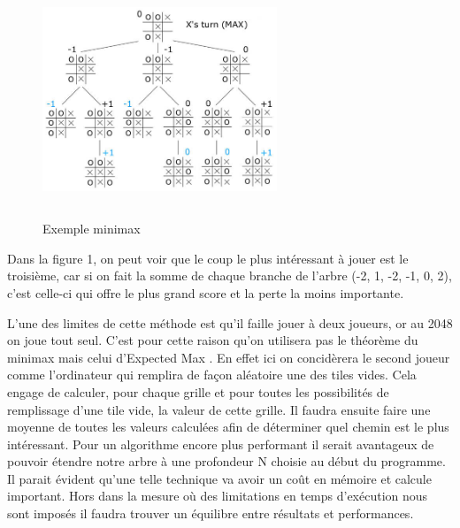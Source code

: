 \documentclass{article}
\begin{document}
\begin{figure}[!h]
   \includegraphics[width=7cm,height=7cm]{minimax.jpg}
   \caption{\label{minimax} Exemple minimax}
\end{figure}

Dans la figure 1, on peut voir que le coup le plus intéressant à jouer est le troisi\`eme, car si on fait la somme de chaque branche de l'arbre (-2, 1, -2, -1, 0, 2), c'est celle-ci qui offre le plus grand score et la perte la moins importante.

L'une des limites de cette m\'ethode est qu'il faille jouer \`a deux joueurs, or au 2048 on joue tout seul. C'est pour cette raison qu'on utilisera pas le th\'eor\`eme du \og minimax \fg{} mais celui d'\og Expected Max \fg{}. En effet ici on concid\`erera le second joueur comme l'ordinateur qui remplira de façon aléatoire une des tiles vides. Cela engage de calculer, pour chaque grille et pour toutes les possibilit\'es de remplissage d'une tile vide, la valeur de cette grille. Il faudra ensuite faire une moyenne de toutes les valeurs calculées afin de déterminer quel chemin est le plus intéressant. Pour un algorithme encore plus performant il serait avantageux de pouvoir \'etendre notre arbre \`a une profondeur N choisie au d\'ebut du programme. Il parait évident qu'une telle technique va avoir un coût en mémoire et calcule important. Hors dans la mesure où des limitations en temps d'exécution nous sont imposés il faudra trouver un équilibre entre résultats et performances.
\end{document}
